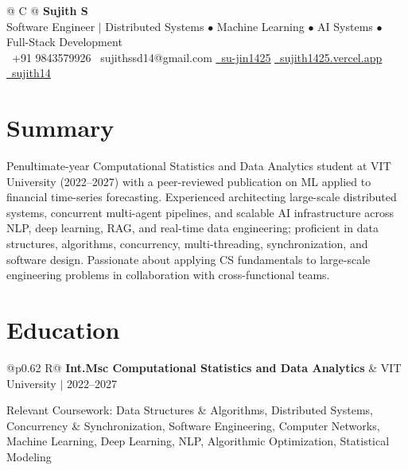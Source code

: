 \documentclass[a4paper,10pt]{article}
\newcommand{\ulink}[2]{\href{#1}{\uline{#2}}}
\newcommand{\subheading}[1]{{\color[HTML]{0A0A0A}\fontsize{12}{14}\selectfont\bfseries #1}}
\newcommand{\meta}[1]{{\color[HTML]{5C5C5C}\fontsize{10.5}{12.5}\selectfont #1}}
\begin{document}
\pagestyle{empty}

\begin{tabularx}{\linewidth}{@{} C @{}}
  {\color[HTML]{000000}\fontsize{30}{35}\selectfont\bfseries Sujith S} \\[5pt]
  {\fontsize{10.5}{12.5}\selectfont\color[HTML]{3A3A3A}Software Engineer $|$ Distributed Systems $\bullet$ Machine Learning $\bullet$ AI Systems $\bullet$ Full-Stack Development} \\[6pt]
  {\fontsize{10.5}{12.5}\selectfont
    \textcolor[HTML]{3A3A3A}{%
    {}\ +91 9843579926
    \quad
    {\faEnvelope}\ sujithssd14@gmail.com
    \quad
    \ulink{https://github.com/su-jin1425}{{\faGithub}\ su-jin1425}
    \quad
    \ulink{https://sujith1425.vercel.app}{{\faGlobe}\ sujith1425.vercel.app}
    \quad
    \ulink{https://linkedin.com/in/sujith14}{{\faLinkedin}\ sujith14}
    }
}
\end{tabularx}

\vspace{2pt}

\section{Summary}
\vspace{2pt}
{\color[HTML]{0A0A0A}\fontsize{11}{14}\selectfont
Penultimate-year Computational Statistics and Data Analytics student at VIT University (2022--2027) with a peer-reviewed publication on ML applied to financial time-series forecasting. Experienced architecting large-scale distributed systems, concurrent multi-agent pipelines, and scalable AI infrastructure across NLP, deep learning, RAG, and real-time data engineering; proficient in data structures, algorithms, concurrency, multi-threading, synchronization, and software design. Passionate about applying CS fundamentals to large-scale engineering problems in collaboration with cross-functional teams.
}

\vspace{2pt}

\section{Education}
\vspace{2pt}

\begin{tabularx}{\linewidth}{@{}p{0.62\linewidth} R@{}}
  \subheading{Int.Msc Computational Statistics and Data Analytics} &
  \meta{VIT University $|$ 2022--2027}
\end{tabularx}
\vspace{2pt}
{\color[HTML]{3A3A3A}\fontsize{11}{14}\selectfont Relevant Coursework: Data Structures \& Algorithms, Distributed Systems, Concurrency \& Synchronization, Software Engineering, Computer Networks, Machine Learning, Deep Learning, NLP, Algorithmic Optimization, Statistical Modeling}
\end{document}
